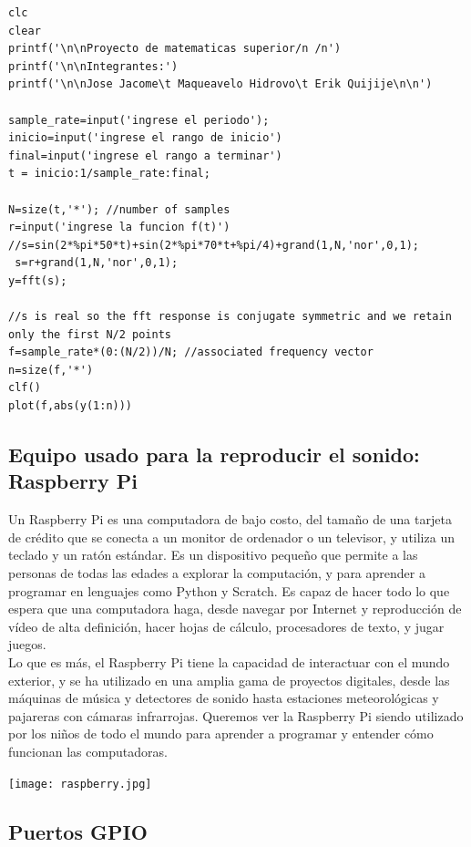 \documentclass[10pt,a4paper]{book}
\begin{document}
\begin{verbatim}
clc 
clear 
printf('\n\nProyecto de matematicas superior/n /n') 
printf('\n\nIntegrantes:') 
printf('\n\nJose Jacome\t Maqueavelo Hidrovo\t Erik Quijije\n\n') 

sample_rate=input('ingrese el periodo'); 
inicio=input('ingrese el rango de inicio') 
final=input('ingrese el rango a terminar') 
t = inicio:1/sample_rate:final; 

N=size(t,'*'); //number of samples 
r=input('ingrese la funcion f(t)') 
//s=sin(2*%pi*50*t)+sin(2*%pi*70*t+%pi/4)+grand(1,N,'nor',0,1); 
 s=r+grand(1,N,'nor',0,1); 
y=fft(s); 

//s is real so the fft response is conjugate symmetric and we retain only the first N/2 points 
f=sample_rate*(0:(N/2))/N; //associated frequency vector 
n=size(f,'*') 
clf() 
plot(f,abs(y(1:n)))
\end{verbatim}

\subsection{Equipo usado para la reproducir el sonido: Raspberry Pi}

Un Raspberry Pi es una computadora de bajo costo, del tamaño de una  tarjeta de crédito que se conecta a un monitor de ordenador o un televisor, y utiliza un teclado y un ratón estándar. Es un dispositivo pequeño que permite a las personas de todas las edades a explorar la computación, y para aprender a programar en lenguajes como Python y Scratch. Es capaz de hacer todo lo que espera que una computadora haga, desde navegar por Internet y reproducción de vídeo de alta definición, hacer hojas de cálculo, procesadores de texto, y jugar juegos.\\

Lo que es más, el Raspberry Pi tiene la capacidad de interactuar con el mundo exterior, y se ha utilizado en una amplia gama de proyectos  digitales, desde las máquinas de música y detectores de sonido hasta estaciones meteorológicas y  pajareras con cámaras infrarrojas. Queremos ver la Raspberry Pi siendo utilizado por los niños de todo el mundo para aprender a programar y entender cómo funcionan las computadoras.\\

\begin{center}
	\texttt{[image: raspberry.jpg]}
\end{center}

\subsection{Puertos GPIO}
\end{document}
